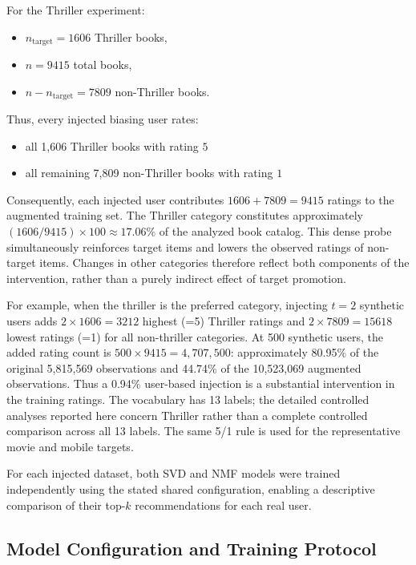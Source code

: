\documentclass[information,article,submit,pdftex,moreauthors]{Definitions/mdpi}
\begin{document}
For the Thriller experiment:
\begin{itemize}
    \item $n_{\text{target}} = 1606$ Thriller books,
    
    \item $n = 9415$ total books,
    
    \item $n - n_{\text{target}} = 7809$ non-Thriller books.
\end{itemize}

Thus, every injected biasing user rates:

\begin{itemize}
    \item all 1,606 Thriller books with rating $5$
    \item all remaining 7,809 non-Thriller books with rating $1$
\end{itemize}

Consequently, each injected user contributes
\(1606 + 7809 = 9415\)
ratings to the augmented training set. The Thriller category constitutes approximately $(1606/9415)\times100\approx17.06\%$ of the analyzed book catalog. This dense probe simultaneously reinforces target items and lowers the observed ratings of non-target items. Changes in other categories therefore reflect both components of the intervention, rather than a purely indirect effect of target promotion. 

For example, when the thriller is the preferred category, injecting $t=2$ synthetic users adds  $2\times1606=3212$  highest (=5) Thriller ratings and
 $2\times7809=15618$  lowest ratings (=1) for all non-thriller categories.
At 500 synthetic users, the added rating count is $500\times9415=4,707,500$: approximately 80.95\% of the original 5,815,569 observations and 44.74\% of the 10,523,069 augmented observations. Thus a 0.94\% user-based injection is a substantial intervention in the training ratings. The vocabulary has 13 labels; the detailed controlled analyses reported here concern Thriller rather than a complete controlled comparison across all 13 labels. The same 5/1 rule is used for the representative movie and mobile targets.

For each injected dataset, both SVD and NMF models were trained independently using the stated shared configuration, enabling a descriptive comparison of their top-$k$ recommendations for each real user.


\subsection{Model Configuration and Training Protocol}
\end{document}
